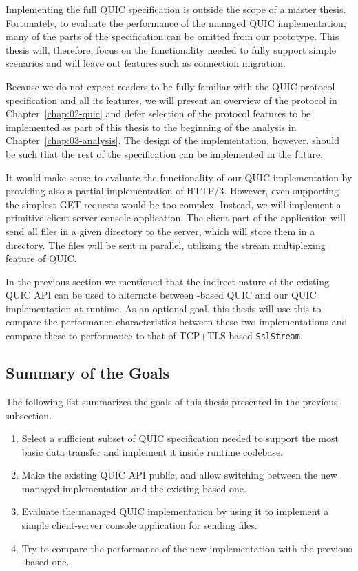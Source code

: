 Implementing the full QUIC specification is outside the scope of a master thesis. Fortunately, to
evaluate the performance of the managed QUIC implementation, many of the parts of the specification
can be omitted from our prototype. This thesis will, therefore, focus on the functionality needed to
fully support simple scenarios and will leave out features such as connection migration.

Because we do not expect readers to be fully familiar with the QUIC protocol specification and all
its features, we will present an overview of the protocol in Chapter~\ref{chap:02-quic} and defer
selection of the protocol features to be implemented as part of this thesis to the beginning of the
analysis in Chapter~\ref{chap:03-analysis}. The design of the implementation, however, should be
such that the rest of the specification can be implemented in the future.

It would make sense to evaluate the functionality of our QUIC implementation by providing also a
partial implementation of HTTP/3. However, even supporting the simplest GET requests would be too
complex. Instead, we will implement a primitive client-server console application. The client part
of the application will send all files in a given directory to the server, which will store them in
a directory. The files will be sent in parallel, utilizing the stream multiplexing feature of
QUIC\@.

In the previous section we mentioned that the indirect nature of the existing QUIC API can be used
to alternate between \libmsquic{}-based QUIC and our QUIC implementation at runtime. As an optional
goal, this thesis will use this to compare the performance characteristics between these two
implementations and compare these to performance to that of TCP+TLS based \texttt{SslStream}.

\subsection*{Summary of the Goals}

The following list summarizes the goals of this thesis presented in the previous subsection.

\begin{enumerate}

  \item Select a sufficient subset of QUIC specification needed to support the most basic data
    transfer and implement it inside \dotnet{} runtime codebase.

  \item Make the existing QUIC API public, and allow switching between the new managed
    implementation and the existing \libmsquic{} based one.

  \item Evaluate the managed QUIC implementation by using it to implement a simple client-server
    console application for sending files.

  \item {} Try to compare the performance of the new
    implementation with the previous \libmsquic{}-based one.

\end{enumerate}
